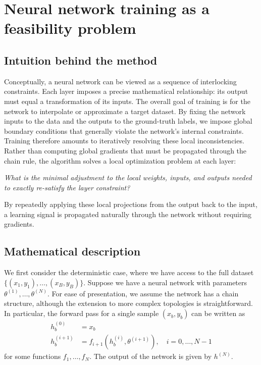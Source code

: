 \documentclass{article}
\let\Cref\crtCref
\begin{document}
\section{Neural network training as a feasibility problem} \label{sec:nn_feas}

\subsection{Intuition behind the method}
Conceptually, a neural network can be viewed as a sequence of interlocking constraints. Each layer imposes a precise mathematical relationship: its output must equal a transformation of its inputs. The overall goal of training is for the network to interpolate or approximate a target dataset. By fixing the network inputs to the data and the outputs to the ground-truth labels, we impose global boundary conditions that generally violate the network's internal constraints. Training therefore amounts to iteratively resolving these local inconsistencies.  Rather than computing global gradients that must be propagated through the chain rule, the algorithm solves a local optimization problem at each layer: 

\textit{What is the minimal adjustment to the local weights, inputs, and outputs needed to exactly re-satisfy the layer constraint?}

By repeatedly applying these local projections from the output back to the input, a learning signal is propagated naturally through the network without requiring gradients.

\subsection{Mathematical description} \label{sec:math_desc}

We first consider the deterministic case, where we have access to the full dataset $\{(x_1, y_1), \ldots, (x_B, y_B)\}$. Suppose we have a neural network with parameters $\theta^{(1)}, \ldots, \theta^{(N)}$. For ease of presentation, we assume the network has a chain structure, although the extension to more complex topologies is straightforward. In particular, the forward pass for a single sample $(x_b, y_b)$ can be written as
\begin{align*}
    h^{(0)}_b &= x_b \\
    h^{(i+1)}_b &= f_{i+1}(h^{(i)}_b, \theta^{(i+1)}), \quad 
    i=0,\ldots,N-1
\end{align*}
for some functions $f_1, \ldots, f_N$. The output of the network is given by $h^{(N)}$.
\end{document}
